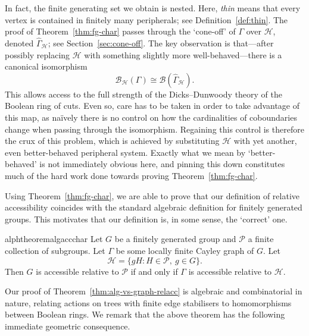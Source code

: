 \documentclass[11pt,a4paper]{amsart}
\theoremstyle{definition}
\newcommand{\per}{\mathcal{H}}
\newcommand{\br}{{\mathscr{B}}}
\begin{document}
In fact, the finite generating set we obtain is nested. Here, \emph{thin} means that every vertex is contained in finitely many peripherals; see Definition~\ref{def:thin}. 
The proof of Theorem~\ref{thm:fg-char} passes through the `cone-off' of $\Gamma$ over $\per$, denoted $\widehat \Gamma_\per$; see Section~\ref{sec:cone-off}. The key observation is that---after possibly replacing $\per$ with something slightly more well-behaved---there is a canonical isomorphism
$$
\br_\per(\Gamma) \cong \br(\widehat \Gamma_\per).
$$
This allows access to the full strength of the Dicks--Dunwoody theory of the Boolean ring of cuts. Even so, care has to be taken in order to take advantage of this map, as na\"ively there is no control on how the cardinalities of coboundaries change when passing through the isomorphism. Regaining this control is therefore the crux of this problem, which is achieved by substituting $\per$ with yet another, even better-behaved peripheral system. Exactly what we mean by `better-behaved' is not immediately obvious here, and pinning this down constitutes much of the hard work done towards proving Theorem~\ref{thm:fg-char}.

Using Theorem~\ref{thm:fg-char}, we are able to prove that our definition of relative accessibility coincides with the standard algebraic definition for finitely generated groups. This motivates that our definition is, in some sense, the `correct' one.



\begin{restatable}{alphtheorem}{algaccchar}\label{thm:alg-vs-graph-relacc}
    Let $G$ be a finitely generated group and $\mathcal P$ a finite collection of subgroups. Let $\Gamma$ be some locally finite Cayley graph of $G$. Let 
    $$
    \per = \{gH : H \in \mathcal P, \ g \in G\}.
    $$
    Then $G$ is accessible relative to $\mathcal P$ if and only if $\Gamma$ is accessible relative to $\per$. 
\end{restatable}


Our proof of Theorem~\ref{thm:alg-vs-graph-relacc} is algebraic and combinatorial in nature, relating actions on trees with finite edge stabilisers to homomorphisms between Boolean rings.
We remark that the above theorem has the following immediate geometric consequence. 
\end{document}
